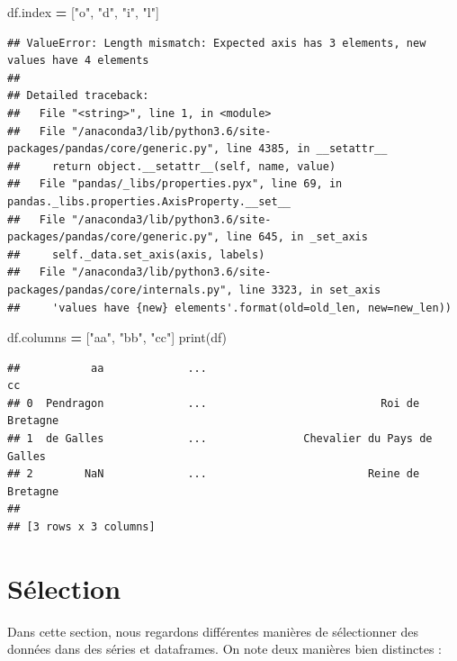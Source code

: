 \documentclass[12pt,]{book}
\newenvironment{Shaded}{\begin{snugshade}}{\end{snugshade}}
\newcommand{\StringTok}[1]{\textcolor[rgb]{0.31,0.60,0.02}{#1}}
\newcommand{\OperatorTok}[1]{\textcolor[rgb]{0.81,0.36,0.00}{\textbf{#1}}}
\newcommand{\BuiltInTok}[1]{#1}
\newcommand{\NormalTok}[1]{#1}
\numberwithin{equation}{section}
\numberwithin{countremarque}{section}
\begin{document}
\begin{Shaded}
\begin{Highlighting}[]
\NormalTok{df.index }\OperatorTok{=}\NormalTok{ [}\StringTok{"o"}\NormalTok{, }\StringTok{"d"}\NormalTok{, }\StringTok{"i"}\NormalTok{, }\StringTok{"l"}\NormalTok{]}
\end{Highlighting}
\end{Shaded}

\begin{lstlisting}
## ValueError: Length mismatch: Expected axis has 3 elements, new values have 4 elements
## 
## Detailed traceback: 
##   File "<string>", line 1, in <module>
##   File "/anaconda3/lib/python3.6/site-packages/pandas/core/generic.py", line 4385, in __setattr__
##     return object.__setattr__(self, name, value)
##   File "pandas/_libs/properties.pyx", line 69, in pandas._libs.properties.AxisProperty.__set__
##   File "/anaconda3/lib/python3.6/site-packages/pandas/core/generic.py", line 645, in _set_axis
##     self._data.set_axis(axis, labels)
##   File "/anaconda3/lib/python3.6/site-packages/pandas/core/internals.py", line 3323, in set_axis
##     'values have {new} elements'.format(old=old_len, new=new_len))
\end{lstlisting}

\begin{Shaded}
\begin{Highlighting}[]
\NormalTok{df.columns }\OperatorTok{=}\NormalTok{ [}\StringTok{"aa"}\NormalTok{, }\StringTok{"bb"}\NormalTok{, }\StringTok{"cc"}\NormalTok{]}
\BuiltInTok{print}\NormalTok{(df)}
\end{Highlighting}
\end{Shaded}

\begin{lstlisting}
##           aa             ...                                        cc
## 0  Pendragon             ...                           Roi de Bretagne
## 1  de Galles             ...               Chevalier du Pays de Galles
## 2        NaN             ...                         Reine de Bretagne
## 
## [3 rows x 3 columns]
\end{lstlisting}

\section{Sélection}\label{pandas-selection}

Dans cette section, nous regardons différentes manières de sélectionner
des données dans des séries et dataframes. On note deux manières bien
distinctes :
\end{document}
